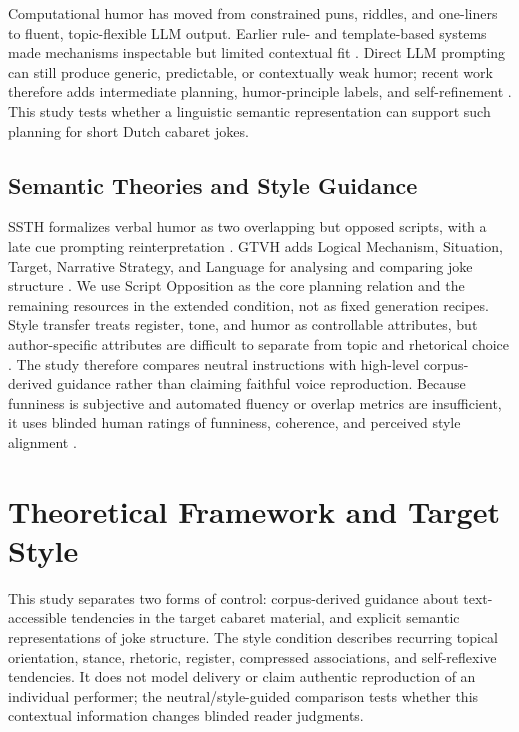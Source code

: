 \documentclass[11pt]{article}
\begin{document}
Computational humor has moved from constrained puns, riddles, and one-liners to fluent, topic-flexible LLM output. Earlier rule- and template-based systems made mechanisms inspectable but limited contextual fit \citep{ritchie2009,amin2020survey}. Direct LLM prompting can still produce generic, predictable, or contextually weak humor; recent work therefore adds intermediate planning, humor-principle labels, and self-refinement \citep{tian2022pun,tikhonov2024humor}. This study tests whether a linguistic semantic representation can support such planning for short Dutch cabaret jokes.

\subsection{Semantic Theories and Style Guidance}\label{semantic-theories-and-style-guidance}

SSTH formalizes verbal humor as two overlapping but opposed scripts, with a late cue prompting reinterpretation \citep{raskin1985}. GTVH adds Logical Mechanism, Situation, Target, Narrative Strategy, and Language for analysing and comparing joke structure \citep{attardo1991}. We use Script Opposition as the core planning relation and the remaining resources in the extended condition, not as fixed generation recipes. Style transfer treats register, tone, and humor as controllable attributes, but author-specific attributes are difficult to separate from topic and rhetorical choice \citep{jin2022style,bhandarkar2024emulating}. The study therefore compares neutral instructions with high-level corpus-derived guidance rather than claiming faithful voice reproduction. Because funniness is subjective and automated fluency or overlap metrics are insufficient, it uses blinded human ratings of funniness, coherence, and perceived style alignment \citep{amin2020survey,mirowski2025theater}.

\section{Theoretical Framework and Target Style}\label{theoretical-framework-and-target-style}

This study separates two forms of control: corpus-derived guidance about text-accessible tendencies in the target cabaret material, and explicit semantic representations of joke structure. The style condition describes recurring topical orientation, stance, rhetoric, register, compressed associations, and self-reflexive tendencies. It does not model delivery or claim authentic reproduction of an individual performer; the neutral/style-guided comparison tests whether this contextual information changes blinded reader judgments.
\end{document}
